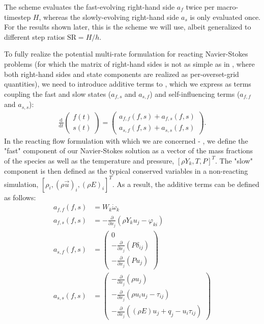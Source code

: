 The scheme evaluates the fast-evolving right-hand side $a_{f}$ twice per
macro-timestep $H$, whereas the slowly-evolving right-hand side $a_{s}$ is only
evaluated once.  For the results shown later, this is the scheme we will use,
albeit generalized to different step ratios $\text{SR} = H/h$.

To fully realize the potential multi-rate formulation for reacting
Navier-Stokes problems (for which the matrix of right-hand sides is
not as simple as in \cite{mikida2019multi}, where both right-hand sides
and state components are realized as per-overset-grid quantities),
we need to introduce additive terms to , which we express
as terms coupling the fast and slow states ($a_{f,s}$ and $a_{s,f}$) and
self-influencing terms ($a_{f,f}$ and $a_{s,s}$):
\begin{align}
\frac{\textrm{d}}{\textrm{d}t}\left( \begin{array}{c} f(t) \\ s(t) \end{array} \right) = \left( \begin{array}{c} a_{f,f}(f,s) + a_{f,s}(f,s) \\ a_{s,f}(f,s) + a_{s,s}(f,s) \end{array} \right). \label{eq:mr_reacting}
\end{align}
In the reacting flow formulation with which we are concerned  - , we define
the "fast" component of our Navier-Stokes solution as a vector of the
mass fractions of the species as well as the temperature and pressure, $[\rho Y_{k}, T, P]^T$.
The "slow" component is then defined as the typical conserved variables in a
non-reacting simulation, $[\rho_{i}, (\rho \vec{u})_{i}, (\rho E)_{i}]^T$. As
a result, the additive terms  can be defined as follows:
\begin{align}
a_{f,f}(f,s) &= W_{k}\dot{\omega}_{k} \\
a_{f,s}(f,s) &= -\frac{\partial}{\partial x_{j}}(\rho Y_{k} u_{j} - \varphi_{ki}) \\
a_{s,f}(f,s) &= \left(\begin{array}{c} 0 \\
                                      -\frac{\partial}{\partial x_{j}}(P\delta_{ij}) \\
                                      -\frac{\partial}{\partial x_{j}}(Pu_{j}) \end{array} \right) \\
a_{s,s}(f,s) &= \left(\begin{array}{c} -\frac{\partial}{\partial x_{j}}(\rho u_{j}) \\
                                      -\frac{\partial}{\partial x_{j}}(\rho u_{i} u_{j} - \tau_{ij}) \\
                                      -\frac{\partial}{\partial x_{j}}((\rho E)u_{j} + q_{j} - u_{i}\tau_{ij}) \end{array} \right)
\end{align}

